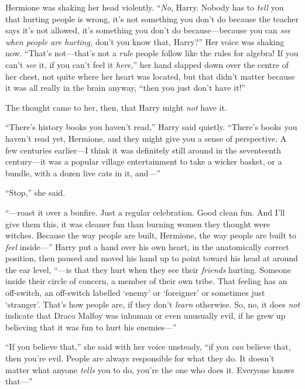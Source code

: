 Hermione was shaking her head violently. “\emph{No}, Harry. Nobody has to \emph{tell} you that hurting people is wrong, it’s not something you don’t do because the teacher says it’s not allowed, it’s something you don’t do because—because you can \emph{see when people are hurting,} don’t you know that, Harry?” Her voice was shaking now. “That’s not—that’s not a \emph{rule} people follow like the rules for algebra! If you can’t \emph{see} it, if you can’t feel it \emph{here,}” her hand slapped down over the centre of her chest, not quite where her heart was located, but that didn’t matter because it was all really in the brain anyway, “then you just don’t have it!”

The thought came to her, then, that Harry might \emph{not} have it.

“There’s history books you haven’t read,” Harry said quietly. “There’s books you haven’t read yet, Hermione, and they might give you a sense of perspective. A few centuries earlier—I think it was definitely still around in the seventeenth century—it was a popular village entertainment to take a wicker basket, or a bundle, with a dozen live cats in it, and—”

“Stop,” she said.

“—roast it over a bonfire. Just a regular celebration. Good clean fun. And I’ll give them this, it was cleaner fun than burning women they thought were witches. Because the way people are built, Hermione, the way people are built to \emph{feel} inside—” Harry put a hand over his own heart, in the anatomically correct position, then paused and moved his hand up to point toward his head at around the ear level, “—is that they hurt when they see their \emph{friends} hurting. Someone inside their circle of concern, a member of their own tribe. That feeling has an off-switch, an off-switch labelled ‘enemy’ or ‘foreigner’ or sometimes just ‘stranger’. That’s how people are, if they don’t \emph{learn} otherwise. So, no, it does \emph{not} indicate that Draco Malfoy was inhuman or even unusually evil, if he grew up believing that it was fun to hurt his enemies—”

“If you believe that,” she said with her voice unsteady, “if you \emph{can} believe that, then you’re evil. People are always responsible for what they do. It doesn’t matter what anyone \emph{tells} you to do, you’re the one who does it. Everyone knows that—”

